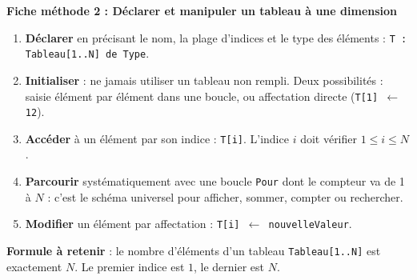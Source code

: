 \documentclass[11pt]{article}
\begin{document}
\textbf{Fiche méthode 2 : Déclarer et manipuler un tableau à une dimension}\par
\begin{methode}
\begin{enumerate}
\item \textbf{Déclarer} en précisant le nom, la plage d'indices et le type des éléments :
\texttt{T : Tableau[1..N] de Type}.
\item \textbf{Initialiser} : ne jamais utiliser un tableau non rempli. Deux possibilités : saisie élément par élément dans une boucle, ou affectation directe (\texttt{T[1] $\leftarrow$ 12}).
\item \textbf{Accéder} à un élément par son indice : \texttt{T[i]}. L'indice $i$ doit vérifier $1 \leq i \leq N$.
\item \textbf{Parcourir} systématiquement avec une boucle \texttt{Pour} dont le compteur va de 1 à $N$ : c'est le schéma universel pour afficher, sommer, compter ou rechercher.
\item \textbf{Modifier} un élément par affectation : \texttt{T[i] $\leftarrow$ nouvelleValeur}.
\end{enumerate}
\textbf{Formule à retenir} : le nombre d'éléments d'un tableau \texttt{Tableau[1..N]} est exactement $N$. Le premier indice est $1$, le dernier est $N$.
\end{methode}
\end{document}

